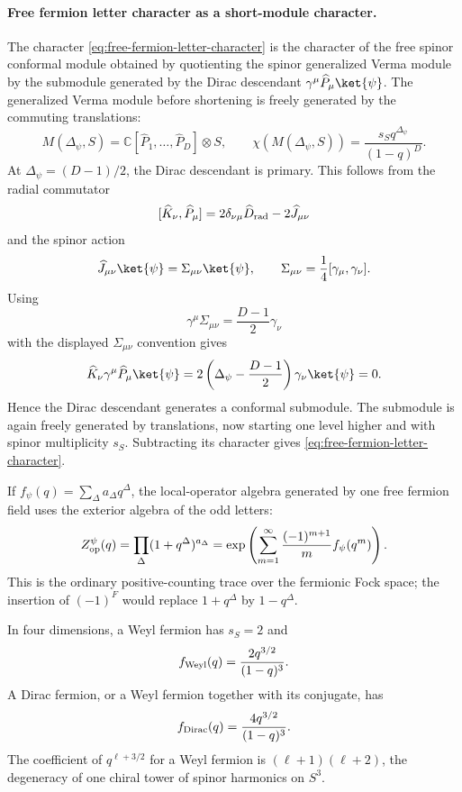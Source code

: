 \paragraph{Free fermion letter character as a short-module character.}
The character \eqref{eq:free-fermion-letter-character} is the character of
the free spinor conformal module obtained by quotienting the spinor
generalized Verma module by the submodule generated by the Dirac descendant
\(\gamma^\mu\widehat P_\mu\ket{\psi}\).
The generalized Verma module before shortening is freely generated by the
commuting translations:
\[
  M(\Delta_\psi,S)
  =
  \mathbb C[\widehat P_1,\ldots,\widehat P_D]\otimes S,
  \qquad
  \chi(M(\Delta_\psi,S))
  =
  \frac{s_S q^{\Delta_\psi}}{(1-q)^D}.
\]
At \(\Delta_\psi=(D-1)/2\), the Dirac descendant is primary.  This follows
from the radial commutator
\[
  [\widehat K_\nu,\widehat P_\mu]
  =
  2\delta_{\nu\mu}\widehat D_{\rm rad}
  -2\widehat J_{\mu\nu}
\]
and the spinor action
\[
  \widehat J_{\mu\nu}\ket{\psi}
  =
  \Sigma_{\mu\nu}\ket{\psi},
  \qquad
  \Sigma_{\mu\nu}=\frac14[\gamma_\mu,\gamma_\nu].
\]
Using
\[
  \gamma^\mu\Sigma_{\mu\nu}
  =
  \frac{D-1}{2}\gamma_\nu
\]
with the displayed \(\Sigma_{\mu\nu}\) convention gives
\[
  \widehat K_\nu\gamma^\mu\widehat P_\mu\ket{\psi}
  =
  2\left(\Delta_\psi-\frac{D-1}{2}\right)
  \gamma_\nu\ket{\psi}
  =
  0.
\]
Hence the Dirac descendant generates a conformal submodule.  The submodule is
again freely generated by translations, now starting one level higher and
with spinor multiplicity \(s_S\).  Subtracting its character gives
\eqref{eq:free-fermion-letter-character}.

If \(f_\psi(q)=\sum_\Delta a_\Delta q^\Delta\), the local-operator algebra
generated by one free fermion field uses the exterior algebra of the odd
letters:
\begin{equation}
  Z_{\rm op}^{\psi}(q)
  =
  \prod_\Delta(1+q^\Delta)^{a_\Delta}
  =
  \exp\left(
    \sum_{m=1}^{\infty}\frac{(-1)^{m+1}}{m}f_\psi(q^m)
  \right).
  \label{eq:free-fermion-operator-partition}
\end{equation}
This is the ordinary positive-counting trace over the fermionic Fock space;
the insertion of \((-1)^F\) would replace \(1+q^\Delta\) by
\(1-q^\Delta\).

In four dimensions, a Weyl fermion has \(s_S=2\) and
\[
  f_{\rm Weyl}(q)=\frac{2q^{3/2}}{(1-q)^3}.
\]
A Dirac fermion, or a Weyl fermion together with its conjugate, has
\[
  f_{\rm Dirac}(q)=\frac{4q^{3/2}}{(1-q)^3}.
\]
The coefficient of \(q^{\ell+3/2}\) for a Weyl fermion is
\((\ell+1)(\ell+2)\), the degeneracy of one chiral tower of spinor harmonics
on \(S^3\).

